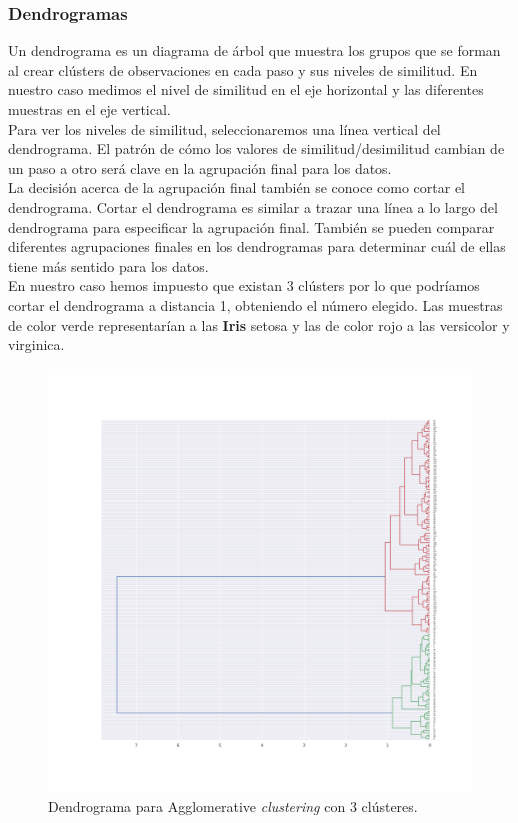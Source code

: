 \documentclass[a4paper, 20pt]{article}
\begin{document}
\clearpage

\subsubsection{Dendrogramas}

Un dendrograma es un diagrama de árbol que muestra los grupos que se forman al crear clústers de observaciones en cada paso y sus niveles de similitud. En nuestro caso medimos el nivel de similitud en el eje horizontal y las diferentes muestras en el eje vertical.\\

Para ver los niveles de similitud, seleccionaremos una línea vertical del dendrograma. El patrón de cómo los valores de similitud/desimilitud cambian de un paso a otro será clave en la agrupación final para los datos.\\

La decisión acerca de la agrupación final también se conoce como cortar el dendrograma. Cortar el dendrograma es similar a trazar una línea a lo largo del dendrograma para especificar la agrupación final. También se pueden comparar diferentes agrupaciones finales en los dendrogramas para determinar cuál de ellas tiene más sentido para los datos.\\

En nuestro caso hemos impuesto que existan 3 clústers por lo que podríamos cortar el dendrograma a distancia 1, obteniendo el número elegido. Las muestras de color verde representarían a las \textbf{Iris} setosa y las de color rojo a las versicolor y virginica.

\begin{figure}[h]
\centering
\includegraphics[scale=0.35]{dani/dendrogramAggClusterIRIS.png}
\caption{Dendrograma para Agglomerative \textit{clustering} con 3 clústeres.}
\label{dac}
\end{figure}
\end{document}
